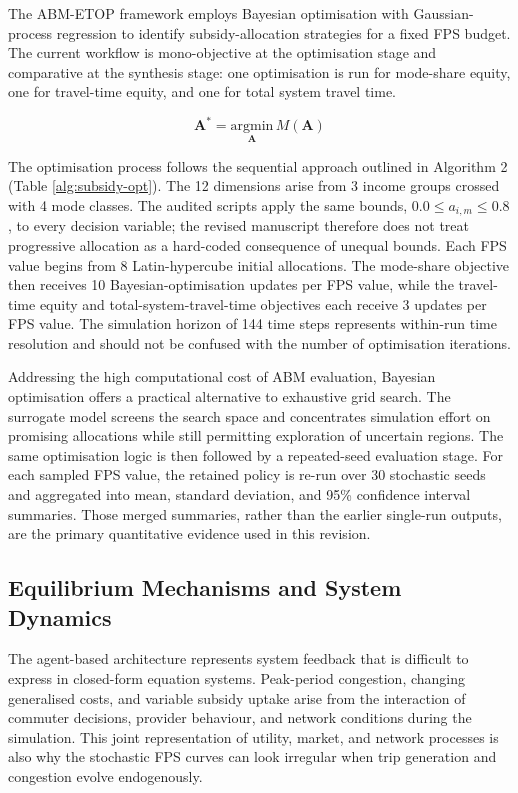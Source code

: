 \documentclass[a4paper,fleqn]{cas-sc}
\begin{document}
The ABM-ETOP framework employs Bayesian optimisation with Gaussian-process regression to identify subsidy-allocation strategies for a fixed FPS budget. The current workflow is mono-objective at the optimisation stage and comparative at the synthesis stage: one optimisation is run for mode-share equity, one for travel-time equity, and one for total system travel time.

\begin{equation}
\mathbf{A}^* = \underset{\mathbf{A}}{\text{argmin}} \, M(\mathbf{A})
\end{equation}

The optimisation process follows the sequential approach outlined in Algorithm 2 (Table \ref{alg:subsidy-opt}). The 12 dimensions arise from 3 income groups crossed with 4 mode classes. The audited scripts apply the same bounds, $0.0 \leq a_{i,m} \leq 0.8$, to every decision variable; the revised manuscript therefore does not treat progressive allocation as a hard-coded consequence of unequal bounds. Each FPS value begins from 8 Latin-hypercube initial allocations. The mode-share objective then receives 10 Bayesian-optimisation updates per FPS value, while the travel-time equity and total-system-travel-time objectives each receive 3 updates per FPS value. The simulation horizon of 144 time steps represents within-run time resolution and should not be confused with the number of optimisation iterations.

Addressing the high computational cost of ABM evaluation, Bayesian optimisation offers a practical alternative to exhaustive grid search. The surrogate model screens the search space and concentrates simulation effort on promising allocations while still permitting exploration of uncertain regions. The same optimisation logic is then followed by a repeated-seed evaluation stage. For each sampled FPS value, the retained policy is re-run over 30 stochastic seeds and aggregated into mean, standard deviation, and 95\% confidence interval summaries. Those merged summaries, rather than the earlier single-run outputs, are the primary quantitative evidence used in this revision.

\subsection{Equilibrium Mechanisms and System Dynamics}
The agent-based architecture represents system feedback that is difficult to express in closed-form equation systems. Peak-period congestion, changing generalised costs, and variable subsidy uptake arise from the interaction of commuter decisions, provider behaviour, and network conditions during the simulation. This joint representation of utility, market, and network processes is also why the stochastic FPS curves can look irregular when trip generation and congestion evolve endogenously.
\end{document}
